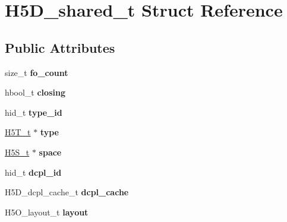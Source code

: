 \hypertarget{struct_h5_d__shared__t}{}\section{H5\+D\+\_\+shared\+\_\+t Struct Reference}
\label{struct_h5_d__shared__t}
\subsection*{Public Attributes}
\begin{DoxyCompactItemize}
\item 
\mbox{\label{struct_h5_d__shared__t_aa3dfce41017b3c3e5677c6852856bbd7}} 
size\+\_\+t {\bfseries fo\+\_\+count}
\item 
\mbox{\label{struct_h5_d__shared__t_ab33dc8ba1a9e0c85851d14af2e39e0a5}} 
hbool\+\_\+t {\bfseries closing}
\item 
\mbox{\label{struct_h5_d__shared__t_a06fc21cdcd12c6e822b68897c562da70}} 
hid\+\_\+t {\bfseries type\+\_\+id}
\item 
\mbox{\label{struct_h5_d__shared__t_aae0cd3c96a7506449aa076592159c7cb}} 
\hyperlink{struct_h5_t__t}{H5\+T\+\_\+t} $\ast$ {\bfseries type}
\item 
\mbox{\label{struct_h5_d__shared__t_a9ca04d7025897a5ce71ace8945b4ccce}} 
\hyperlink{struct_h5_s__t}{H5\+S\+\_\+t} $\ast$ {\bfseries space}
\item 
\mbox{\label{struct_h5_d__shared__t_a1fa8fb43bf0ecdece5965acf55e132ac}} 
hid\+\_\+t {\bfseries dcpl\+\_\+id}
\item 
\mbox{\label{struct_h5_d__shared__t_ae0e8fc621284679e1e122409c5dd1b39}} 
H5\+D\+\_\+dcpl\+\_\+cache\+\_\+t {\bfseries dcpl\+\_\+cache}
\item 
\mbox{\label{struct_h5_d__shared__t_a96b1105667b9321f7a1dbc0d52435a2c}} 
H5\+O\+\_\+layout\+\_\+t {\bfseries layout}
\item 
\mbox{\label{struct_h5_d__shared__t_a59329b7806786f2c13a5d67162972242}} 

\end{DoxyCompactItemize}
